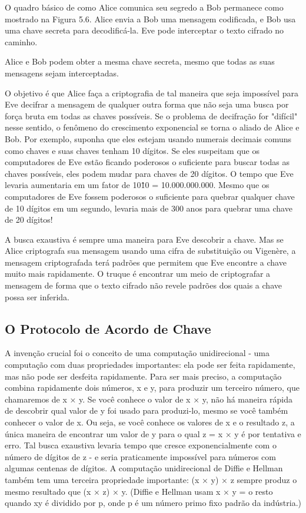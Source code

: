 \documentclass{book}
\begin{document}
O quadro básico de como Alice comunica seu segredo a Bob permanece como mostrado na Figura 5.6. Alice envia a Bob uma mensagem codificada, e Bob usa uma chave secreta para decodificá-la. Eve pode interceptar o texto cifrado no caminho.

Alice e Bob podem obter a mesma chave secreta, mesmo que todas as suas mensagens sejam interceptadas.

O objetivo é que Alice faça a criptografia de tal maneira que seja impossível para Eve decifrar a mensagem de qualquer outra forma que não seja uma busca por força bruta em todas as chaves possíveis. Se o problema de decifração for "difícil" nesse sentido, o fenômeno do crescimento exponencial se torna o aliado de Alice e Bob. Por exemplo, suponha que eles estejam usando numerais decimais comuns como chaves e suas chaves tenham 10 dígitos. Se eles suspeitam que os computadores de Eve estão ficando poderosos o suficiente para buscar todas as chaves possíveis, eles podem mudar para chaves de 20 dígitos. O tempo que Eve levaria aumentaria em um fator de 10\^10 = 10.000.000.000. Mesmo que os computadores de Eve fossem poderosos o suficiente para quebrar qualquer chave de 10 dígitos em um segundo, levaria mais de 300 anos para quebrar uma chave de 20 dígitos!

A busca exaustiva é sempre uma maneira para Eve descobrir a chave. Mas se Alice criptografa sua mensagem usando uma cifra de substituição ou Vigenère, a mensagem criptografada terá padrões que permitem que Eve encontre a chave muito mais rapidamente. O truque é encontrar um meio de criptografar a mensagem de forma que o texto cifrado não revele padrões dos quais a chave possa ser inferida.


\subsection{O Protocolo de Acordo de Chave}
\label{}

A invenção crucial foi o conceito de uma computação unidirecional - uma computação com duas propriedades importantes: ela pode ser feita rapidamente, mas não pode ser desfeita rapidamente. Para ser mais preciso, a computação combina rapidamente dois números, x e y, para produzir um terceiro número, que chamaremos de x × y. Se você conhece o valor de x × y, não há maneira rápida de descobrir qual valor de y foi usado para produzi-lo, mesmo se você também conhecer o valor de x. Ou seja, se você conhece os valores de x e o resultado z, a única maneira de encontrar um valor de y para o qual z = x × y é por tentativa e erro. Tal busca exaustiva levaria tempo que cresce exponencialmente com o número de dígitos de z - e seria praticamente impossível para números com algumas centenas de dígitos. A computação unidirecional de Diffie e Hellman também tem uma terceira propriedade importante: (x × y) × z sempre produz o mesmo resultado que (x × z) × y. (Diffie e Hellman usam x × y = o resto quando xy é dividido por p, onde p é um número primo fixo padrão da indústria.)
\end{document}
